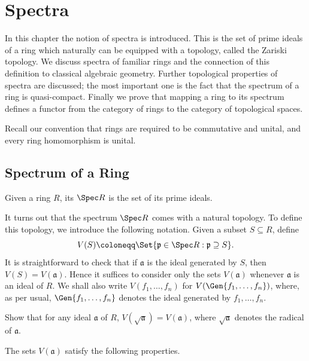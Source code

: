 	\chapter{Spectra}

In this chapter the notion of spectra is introduced. This is the set of prime ideals of a ring which naturally can be equipped with a topology, called the Zariski topology. We discuss spectra of familiar rings and the connection of this definition to classical algebraic geometry. Further topological properties of spectra are discussed; the most important one is the fact that the spectrum of a ring is quasi-compact. Finally we prove that mapping a ring to its spectrum defines a functor from the category of rings to the category of topological spaces.

Recall our convention that rings are required to be commutative and unital, and every ring homomorphism is unital.

\section{Spectrum of a Ring}
\begin{definition}
	Given a ring $R$, its  $\Spec R$ is the set of its prime ideals.
\end{definition}

It turns out that the spectrum $\Spec R$ comes with a natural topology. To define this topology, we introduce the following notation. Given a subset $S \subseteq R$, define
\begin{equation*}
	V(S) \coloneqq \Set{ \mathfrak{p} \in \Spec R : \mathfrak{p} \supseteq S}.
\end{equation*}
It is straightforward to check that if $\mathfrak{a}$ is the ideal generated by $S$, then $V(S) = V(\mathfrak{a})$. Hence it suffices to consider only the sets $V(\mathfrak{a})$ whenever $\mathfrak{a}$ is an ideal of $R$. We shall also write $V(f_1, \dotsc, f_n)$ for $V(\Gen{f_1, \dotsc, f_n})$, where, as per usual, $\Gen{f_1, \dotsc, f_n}$ denotes the ideal generated by $f_1, \dotsc, f_n$. 

\begin{exercise}
	Show that for any ideal $\mathfrak{a}$ of $R$, $V(\sqrt{\mathfrak{a}}) = V(\mathfrak{a})$, where $\sqrt{\mathfrak{a}}$ denotes the radical of $\mathfrak{a}$.
\end{exercise}

The sets $V(\mathfrak{a})$ satisfy the following properties.

